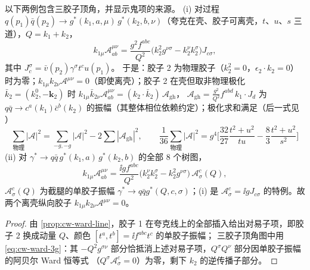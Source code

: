 \begin{proposition}\tagR\label{prop:cw-ward-nonab}
以下两例包含三胶子顶角，并显示鬼项的来源。
(i) 对过程 $q(p_1)\bar q(p_2)\to g^*(k_1,a,\mu)\,g^*(k_2,b,\nu)$（夸克在壳、胶子可离壳，$t$、$u$、$s$ 三道），$Q=k_1+k_2$，
\begin{equation}\label{eq:cw-qqgg}
k_{1\mu}\mathcal A^{\mu\nu}_{ab}=\frac{g^2f^{abc}}{Q^2}\big(k_2^2g^{\nu\sigma}-k_2^\nu k_2^\sigma\big)J_{c\sigma},
\end{equation}
其中 $J_c^\sigma=\bar v(p_2)\gamma^\sigma t^cu(p_1)$。
于是：胶子 2 为物理胶子（$k_2^2=0$，$\epsilon_2\cdot k_2=0$）时为零；$k_{1\mu}k_{2\nu}\mathcal A^{\mu\nu}=0$（即使离壳）；胶子 2 在壳但取非物理极化
$\bar k_2=(k_2^0,-\bm k_2)$ 时 $k_{1\mu}\bar k_{2\nu}\mathcal A^{\mu\nu}_{ab}=(k_2\cdot\bar k_2)\,\mathcal A_{\mathrm{gh}}$，
$\mathcal A_{\mathrm{gh}}=\frac{g^2}{Q^2}f^{abd}\,k_1\cdot J_d$ 为 $q\bar q\to c^a(k_1)\bar c^b(k_2)$ 的振幅（其整体相位依赖约定）；极化求和满足（后一式见
\cite{CombridgeKripfganzRanft1977,EllisStirlingWebber1996}）
\begin{equation}\label{eq:cw-ghost-sum}
\sum_{\text{物理}}|\mathcal A|^2=\sum_{-g,-g}|\mathcal A|^2-2\sum|\mathcal A_{\mathrm{gh}}|^2,\qquad
\frac1{36}\sum_{\text{物理}}|\mathcal A|^2=g^4\Big[\frac{32}{27}\frac{t^2+u^2}{tu}-\frac83\frac{t^2+u^2}{s^2}\Big]
\end{equation}
(ii) 对 $\gamma^*\to q\bar q\,g^*(k_1,a)\,g^*(k_2,b)$ 的全部 8 个树图，
\begin{equation}\label{eq:cw-qqgg2}
k_{1\mu}\mathcal A^{\mu\nu}_{ab}=\frac{\ii gf^{abc}}{Q^2}\big(k_2^\nu k_2^\sigma-k_2^2g^{\nu\sigma}\big)\,\mathcal A^c_\sigma(Q),
\end{equation}
$\mathcal A^c_\sigma(Q)$ 为截腿的单胶子振幅 $\gamma^*\to q\bar qg^*(Q,c,\sigma)$；(i) 是 $\mathcal A^c_\sigma=\ii gJ_{c\sigma}$ 的特例。故两个离壳纵向胶子
$k_{1\mu}k_{2\nu}\mathcal A^{\mu\nu}=0$。
\end{proposition}

\begin{proof}
由 \cref{prop:cw-ward-line}，胶子 1 在夸克线上的全部插入给出对易子项，即胶子 2 换成动量 $Q$、颜色 $[t^a,t^b]=\ii f^{abc}t^c$ 的单胶子振幅；
三胶子顶角图中用 \cref{eq:cw-ward-3g}：其 $-Q^2g^{\sigma\nu}$ 部分恰抵消上述对易子项，$Q^\sigma Q^\nu$ 部分因单胶子振幅的阿贝尔 Ward 恒等式
（$Q^\sigma\mathcal A^c_\sigma=0$）为零，剩下 $k_2$ 的逆传播子部分。
\end{proof}

